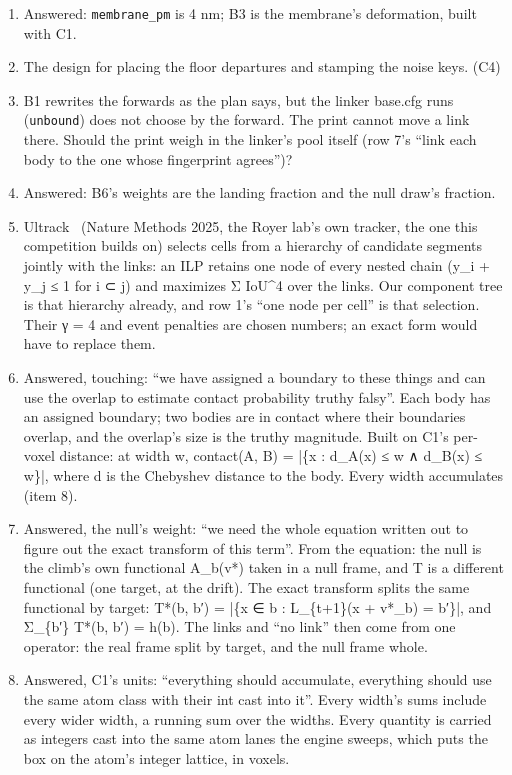 \begin{enumerate}
\item Answered: \texttt{membrane\_\allowbreak{}pm} is 4 nm; B3 is the membrane's deformation, built with C1.
\item The design for placing the floor departures and stamping the noise keys. (C4)
\item B1 rewrites the forwards as the plan says, but the linker base.cfg runs (\texttt{unbound}) does not choose by the forward. The print cannot move a link there. Should the print weigh in the linker's pool itself (row 7's “link each body to the one whose fingerprint agrees”)?
\item Answered: B6's weights are the landing fraction and the null draw's fraction.
\item Ultrack~\cite{src:Ultrack} (Nature Methods 2025, the Royer lab's own tracker, the one this competition builds on) selects cells from a hierarchy of candidate segments jointly with the links: an ILP retains one node of every nested chain (y\_\allowbreak{}i + y\_\allowbreak{}j ≤ 1 for i ⊂ j) and maximizes Σ IoU\textasciicircum{}4 over the links. Our component tree is that hierarchy already, and row 1's “one node per cell” is that selection. Their γ = 4 and event penalties are chosen numbers; an exact form would have to replace them.
\item Answered, touching: “we have assigned a boundary to these things and can use the overlap to estimate contact probability truthy falsy”. Each body has an assigned boundary; two bodies are in contact where their boundaries overlap, and the overlap's size is the truthy magnitude. Built on C1's per-voxel distance: at width w, contact(A, B) = |\{x : d\_\allowbreak{}A(x) ≤ w ∧ d\_\allowbreak{}B(x) ≤ w\}|, where d is the Chebyshev distance to the body. Every width accumulates (item 8).
\item Answered, the null's weight: “we need the whole equation written out to figure out the exact transform of this term”. From the equation: the null is the climb's own functional A\_\allowbreak{}b(v*) taken in a null frame, and T is a different functional (one target, at the drift). The exact transform splits the same functional by target: T*(b, b′) = |\{x ∈ b : L\_\allowbreak{}\{t+1\}(x + v*\_\allowbreak{}b) = b′\}|, and Σ\_\allowbreak{}\{b′\} T*(b, b′) = h(b). The links and “no link” then come from one operator: the real frame split by target, and the null frame whole.
\item Answered, C1's units: “everything should accumulate, everything should use the same atom class with their int cast into it”. Every width's sums include every wider width, a running sum over the widths. Every quantity is carried as integers cast into the same atom lanes the engine sweeps, which puts the box on the atom's integer lattice, in voxels.

\end{enumerate}
